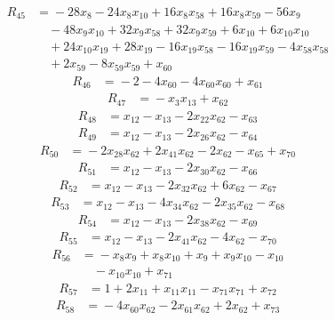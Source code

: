 \begin{align*}
R_{45}&={}-28x_{8} -24x_{8}x_{10} +16x_{8}x_{58} +16x_{8}x_{59} -56x_{9}\\
&\quad{}-48x_{9}x_{10} +32x_{9}x_{58} +32x_{9}x_{59} +6x_{10} +6x_{10}x_{10}\\
&\quad{}+24x_{10}x_{19} +28x_{19} -16x_{19}x_{58} -16x_{19}x_{59} -4x_{58}x_{58}\\
&\quad{}+2x_{59} -8x_{59}x_{59} +x_{60}
\end{align*}
\begin{align*}
R_{46}&={}-2 -4x_{60} -4x_{60}x_{60} +x_{61}
\end{align*}
\begin{align*}
R_{47}&={}-x_{3}x_{13} +x_{62}
\end{align*}
\begin{align*}
R_{48}&={}x_{12} -x_{13} -2x_{22}x_{62} -x_{63}
\end{align*}
\begin{align*}
R_{49}&={}x_{12} -x_{13} -2x_{26}x_{62} -x_{64}
\end{align*}
\begin{align*}
R_{50}&={}-2x_{28}x_{62} +2x_{41}x_{62} -2x_{62} -x_{65} +x_{70}
\end{align*}
\begin{align*}
R_{51}&={}x_{12} -x_{13} -2x_{30}x_{62} -x_{66}
\end{align*}
\begin{align*}
R_{52}&={}x_{12} -x_{13} -2x_{32}x_{62} +6x_{62} -x_{67}
\end{align*}
\begin{align*}
R_{53}&={}x_{12} -x_{13} -4x_{34}x_{62} -2x_{35}x_{62} -x_{68}
\end{align*}
\begin{align*}
R_{54}&={}x_{12} -x_{13} -2x_{38}x_{62} -x_{69}
\end{align*}
\begin{align*}
R_{55}&={}x_{12} -x_{13} -2x_{41}x_{62} -4x_{62} -x_{70}
\end{align*}
\begin{align*}
R_{56}&={}-x_{8}x_{9} +x_{8}x_{10} +x_{9} +x_{9}x_{10} -x_{10}\\
&\quad{}-x_{10}x_{10} +x_{71}
\end{align*}
\begin{align*}
R_{57}&={}1 +2x_{11} +x_{11}x_{11} -x_{71}x_{71} +x_{72}
\end{align*}
\begin{align*}
R_{58}&={}-4x_{60}x_{62} -2x_{61}x_{62} +2x_{62} +x_{73}
\end{align*}
